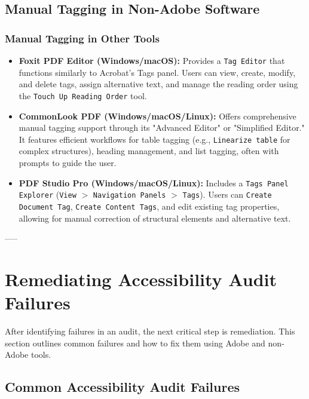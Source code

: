 \subsection{Manual Tagging in Non-Adobe Software}
\label{subsec:manual-tagging-non-adobe}

\subsubsection{Manual Tagging in Other Tools}

\begin{itemize}
\item \textbf{Foxit PDF Editor (Windows/macOS):} Provides a \texttt{Tag Editor} that functions similarly to Acrobat's Tags panel. Users can view, create, modify, and delete tags, assign alternative text, and manage the reading order using the \texttt{Touch Up Reading Order} tool.

\item \textbf{CommonLook PDF (Windows/macOS/Linux):} Offers comprehensive manual tagging support through its "Advanced Editor" or "Simplified Editor." It features efficient workflows for table tagging (e.g., \texttt{Linearize table} for complex structures), heading management, and list tagging, often with prompts to guide the user.

\item \textbf{PDF Studio Pro (Windows/macOS/Linux):} Includes a \texttt{Tags Panel Explorer} (\texttt{View} $>$ \texttt{Navigation Panels} $>$ \texttt{Tags}). Users can \texttt{Create Document Tag}, \texttt{Create Content Tags}, and edit existing tag properties, allowing for manual correction of structural elements and alternative text.
\end{itemize}

-----

\section{Remediating Accessibility Audit Failures}
\label{sec:remediation}
After identifying failures in an audit, the next critical step is remediation. This section outlines common failures and how to fix them using Adobe and non-Adobe tools.

\subsection{Common Accessibility Audit Failures}
\label{subsec:common-failures}

